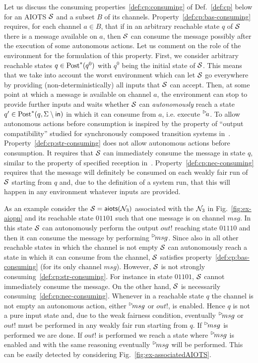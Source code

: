 Let us discuss the consuming properties~\ref{def:cp:consuming} of Def.~\ref{def:cp} below for an AIOTS $\S$ and a subset $B$ of its channels.
Property~\ref{def:cp:bas-consuming} requires,
for each channel $a \in B$, that if in an arbitrary reachable state $q$ of $\S$ there is a message available on $a$, then $\S$ can consume
the message possibly after the execution of some autonomous actions. 
Let us comment on the role of the environment for the formulation of this property.
First, we consider arbitrary reachable states $q \in \post^*(q^0)$ with $q^0$ being the initial state of $\S$.
This means that we take into account the worst environment which can let $\S$ go everywhere by providing (non-deterministically)
all inputs that $\S$ can accept.
Then, at some point at which a message is available on channel $a$, the environment can stop
to provide further inputs and waits whether $\S$ can \emph{autonomously} reach a state
$q' \in \post^*(q,\Sigma\setminus \inset)$ in which it can consume from $a$, i.e. execute ${\inact{a}}$.
To allow autonomous actions before consumption is inspired by the property of ``output compatibility'' studied for synchronously composed transition systems in~\cite{hennicker_knapp_2011}.
Property~\ref{def:cp:str-consuming} does not allow autonomous actions before consumption.
It requires that $\S$ can immediately consume the message in state $q$, similar to the property of specified reception in~\cite{Brand:1983:CFM:322374.322380}.
Property~\ref{def:cp:nec-consuming} requires that the message will definitely be consumed on each weakly fair run of $\S$ starting from $q$ and, due to the definition of a system run, that this will happen in any environment whatever inputs are provided.

As an example consider the \AIOTS $\S = \aiots(\pnN_3)$  associated with the \AIOPN $\pnN_3$ in Fig.~\ref{fig:ex-aiopn}
and its reachable state $01101$ such that one message is on channel $msg$.
In this state $\S$ can autonomously perform the output $out!$ reaching state $01110$
and then it can consume the message by performing $\inact{msg}$. Since also in all other reachable states
in which the channel  is not empty $\S$ can autonomously reach a state in which it can consume from the channel,
$\S$ satisfies property~\ref{def:cp:bas-consuming} (for its only channel $msg$).
However, $\S$ is not strongly consuming~\ref{def:cp:str-consuming}.
For instance in state $01101$, $\S$ cannot immediately consume the message.
On the other hand, $\S$ is necessarily consuming~\ref{def:cp:nec-consuming}.
Whenever in a reachable state $q$ the channel is not empty an autonomous action, either $\inact{msg}$ or $out!$,
is enabled. Hence $q$ is not a pure input state and, due to the weak fairness condition, eventually $\inact{msg}$ or $out!$ must be performed
in any weakly fair run starting from $q$. If $\inact{msg}$ is performed we are done. If $out!$ is performed we reach a state
where $\inact{msg}$ is enabled and with the same reasoning eventually  $\inact{msg}$ will be performed. This can be easily detected
by considering Fig.~\ref{fig:ex-associatedAIOTS}.

